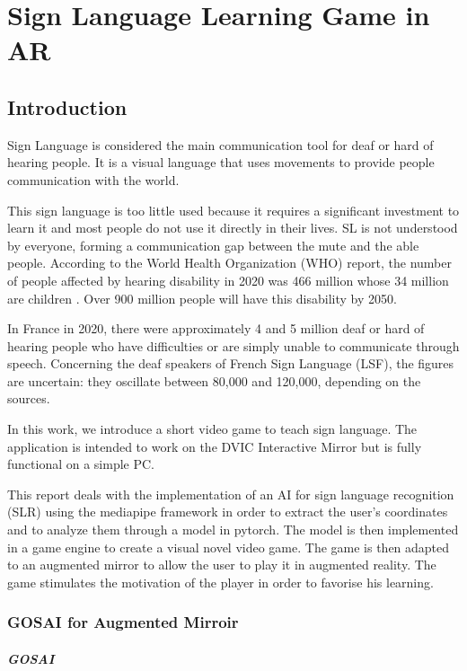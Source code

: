\chapter{Sign Language Learning Game in AR}

\section{Introduction}

Sign Language is considered the main communication tool for deaf or hard of hearing people. It is a visual language that uses movements to provide people communication with the world. 

This sign language is too little used because it requires a significant investment to learn it and most people do not use it directly in their lives. SL is not understood by everyone, forming a communication gap between the mute and the able people. According to the World Health Organization (WHO) report, the number of people affected by hearing disability in 2020 was 466 million whose 34 million are children \cite{el2020sign}. Over 900 million people will have this disability by 2050.

In France in 2020, there were approximately 4 and 5 million deaf or hard of hearing people who have difficulties or are simply unable to communicate through speech. Concerning the deaf speakers of French Sign Language (LSF), the figures are uncertain: they oscillate between 80,000 and 120,000, depending on the sources.

In this work, we introduce a short video game to teach sign language. The application is intended to work on the DVIC Interactive Mirror but is fully functional on a simple PC.

This report deals with the implementation of an AI for sign language recognition (SLR) using the mediapipe framework in order to extract the user’s coordinates and to analyze them through a model in pytorch. The model is then implemented in a game engine to create a visual novel video game. The game is then adapted to an augmented mirror to allow the user to play it in augmented reality. The game stimulates the motivation of the player in order to favorise his learning.

\subsection{GOSAI for Augmented Mirroir}

\paragraph[short]{GOSAI}


